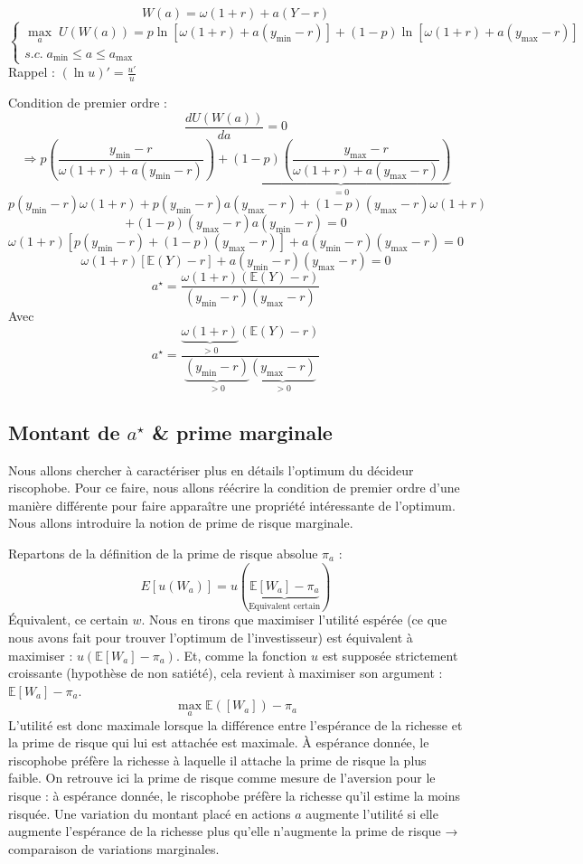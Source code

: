 \documentclass[a4paper, 12pt]{report}
\begin{document}
\[ W(a)=\omega(1+r)+a(Y-r) \]
\[ \begin{cases}
	\underset{a}{\max}\;U(W(a)) =p\ln\left[ \omega(1+r)+a(y_{\min}-r)\right]+(1-p) \ln\left[ \omega(1+r)+a(y_{\max}-r) \right]  \\
	s.c.\; a_{\min}\le a \le a_{\max}
\end{cases} \]
\noindent
Rappel : \( \left( \ln u \right)'= \frac{u'}{u} \)

\noindent
Condition de premier ordre :
\[ \frac{d U(W(a))}{da}=0 \]
\[ \Rightarrow p\left( \frac{y_{\min}-r}{\omega(1+r)+a(y_{\min}-r)} \right)+\underbrace{(1-p)\left( \frac{y_{\max}-r}{\omega(1+r)+a(y_{\max}-r)} \right)}_{= 0} \]
\[ p(y_{\min}-r)\omega(1+r)+p(y_{\min}-r)a(y_{\max}-r)+(1-p)(y_{\max}-r)\omega(1+r)
\]
\[ +(1-p)(y_{\max}-r)a(y_{\min}-r)=0 \]
\[ \omega(1+r)\left[ p(y_{\min}-r)+(1-p)(y_{\max}-r)\right]+a(y_{\min}-r) (y_{\max}-r) = 0\]
\[ \omega(1+r)\left[ \mathbb{E}(Y)-r\right]+ a(y_{\min}-r)(y_{\max}-r) = 0\]
\[ a^{\star} = \frac{\omega(1+r)(\mathbb{E}(Y)-r)}{(y_{\min}-r)(y_{\max}-r)} \]
\noindent
Avec
\[ a^{\star} = \frac{\underbrace{\omega(1+r)}_{>0}(\mathbb{E}(Y)-r)}{\underbrace{(y_{\min}-r)}_{>0}\underbrace{(y_{\max}-r)}_{>0}} \]

\subsection{Montant de \(  a^{\star} \) \& prime marginale}

Nous allons chercher à caractériser plus en détails l'optimum du décideur riscophobe. Pour ce faire, nous allons réécrire la condition de premier ordre d'une manière différente pour faire apparaître une propriété intéressante de l'optimum. Nous allons introduire la notion de prime de risque marginale.

Repartons de la définition de la prime de risque absolue \(\pi_a\) :
\[
E\left[ u(W_a) \right] = u\left( \underbrace{\mathbb{E}[W_a] - \pi_a}_{\text{Equivalent certain}}\right)
\]
Équivalent, ce certain \(w\). Nous en tirons que maximiser l'utilité espérée (ce que nous avons fait pour trouver l'optimum de l'investisseur) est équivalent à maximiser : \(u(\mathbb{E}[W_a] - \pi_a)\). Et, comme la fonction \(u\) est supposée strictement croissante (hypothèse de non satiété), cela revient à maximiser son argument : \(\mathbb{E}[W_a] - \pi_a\).
\[
\max_a \mathbb{E}([W_a]) - \pi_a 
\]
L'utilité est donc maximale lorsque la différence entre l'espérance de la richesse et la prime de risque qui lui est attachée est maximale. À espérance donnée, le riscophobe préfère la richesse à laquelle il attache la prime de risque la plus faible. On retrouve ici la prime de risque comme mesure de l'aversion pour le risque : à espérance donnée, le riscophobe préfère la richesse qu'il estime la moins risquée. Une variation du montant placé en actions \(a\) augmente l'utilité si elle augmente l'espérance de la richesse plus qu'elle n'augmente la prime de risque → comparaison de variations marginales.
\end{document}

